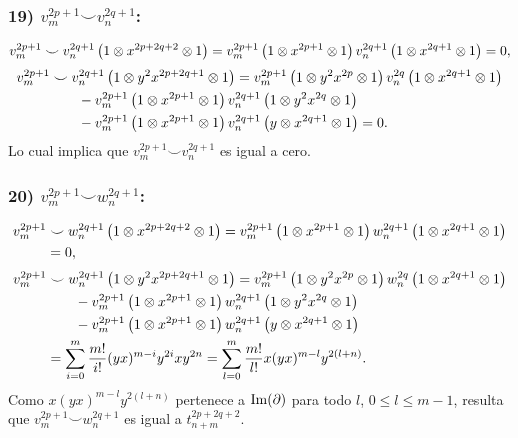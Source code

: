 \documentclass[fleqn,../tesis.tex]{subfiles}
\begin{document}
\subsubsection{19) $v_m^{2p + 1} \smile v_n^{2q + 1}$:}
\begin{align*}
	v_m^{2p + 1}\smile v_n^{2q + 1}\left(1\otimes x^{2p + 2q + 2} \otimes 1\right)
		= v_m^{2p + 1}\left(1\otimes x^{2p + 1}\otimes 1\right)v_n^{2q + 1}\left(1\otimes x^{2q + 1}\otimes 1\right)
		= 0,
\end{align*}
\begin{align*}
	v_m^{2p + 1} &\smile v_n^{2q + 1}\left(1\otimes y^2x^{2p + 2q  + 1} \otimes 1\right)
		= v_m^{2p + 1}\left(1\otimes y^2x^{2p}\otimes 1\right)v_n^{2q} \left(1\otimes x^{2q + 1}\otimes 1\right)\\
	&\qquad - v_m^{2p + 1}\left(1 \otimes x^{2p + 1} \otimes 1\right)
		v_n^{2q + 1}\left(1\otimes y^2x^{2q}\otimes 1\right)\\
	&\qquad - v_m^{2p + 1}\left(1 \otimes x^{2p + 1} \otimes 1\right)
		v_n^{2q + 1}\left(y\otimes x^{2q + 1}\otimes 1\right) = 0.
\end{align*}
Lo cual implica que $v_m^{2p + 1}\smile v_n^{2q + 1}$ es igual a cero.
\subsubsection{20) $v_m^{2p + 1} \smile w_n^{2q + 1}$:}
\begin{align*}
	v_m^{2p + 1} &\smile w_n^{2q + 1}\left(1\otimes x^{2p + 2q + 2} \otimes 1\right)
		= v_m^{2p + 1}\left(1\otimes x^{2p + 1}\otimes 1\right)w_n^{2q + 1}\left(1\otimes x^{2q + 1}\otimes 1\right)\\
		&= 0,
\end{align*}
\begin{align*}
	v_m^{2p + 1} &\smile w_n^{2q + 1}\left(1\otimes y^2x^{2p + 2q  + 1} \otimes 1\right)
		= v_m^{2p + 1}\left(1\otimes y^2x^{2p}\otimes 1\right)w_n^{2q} \left(1\otimes x^{2q + 1}\otimes 1\right)\\
	&\qquad - v_m^{2p + 1}\left(1 \otimes x^{2p + 1} \otimes 1\right)
		w_n^{2q + 1}\left(1\otimes y^2x^{2q}\otimes 1\right)\\
	&\qquad - v_m^{2p + 1}\left(1 \otimes x^{2p + 1} \otimes 1\right)
		w_n^{2q + 1}\left(y\otimes x^{2q + 1}\otimes 1\right)\\
	&= \sum_{i = 0}^{m}\frac{m!}{i!}(yx)^{m - i}y^{2i}xy^{2n}
		=  \sum_{l = 0}^{m}\frac{m!}{l!}x(yx)^{m - l}y^{2(l + n)}.
\end{align*}
Como $x(yx)^{m - l}y^{2(l + n)}$ pertenece a $\operatorname{Im}(\partial)$ para todo $l$, $0 \leq l \leq m - 1$, resulta que
$v_m^{2p + 1}\smile w_n^{2q + 1}$ es igual a $t_{n + m}^{2p + 2q + 2}$.
\end{document}
